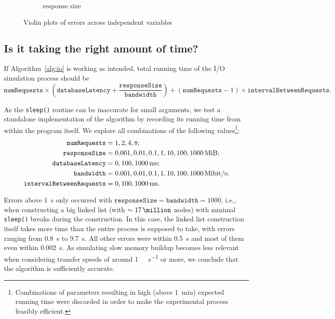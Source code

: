 \documentclass{article}
\begin{document}
\begin{figure}
\begin{subfigure}[t]{0.49\textwidth}
    \caption{response size}
    \label{fig:posterior_violin_response}
  \end{subfigure}
  \caption{Violin plots of errors across independent variables}
  \label{fig:posterior_violins}
\end{figure}

\subsection{Is it taking the right amount of time?}

If Algorithm~\ref{alg:io} is working as intended, total running time of the I/O
simulation process should be
\[
  \texttt{numRequests} \times \left( \texttt{databaseLatency} +
  \frac{\texttt{responseSize}}{\texttt{bandwidth}} \right) +
(\texttt{numRequests} - 1) \times \texttt{intervalBetweenRequests}.
\]

As the \texttt{sleep()} routine can be inaccurate for small arguments, we test
a standalone implementation of the algorithm by recording its running time from
within the program itself. We explore all combinations of the following
values\footnote{Combinations of parameters resulting in high (above
  \SI{1}{\minute}) expected running time were discarded in order to make the
  experimental process feasibly efficient.}:
\begin{align*}
  \texttt{numRequests} &= 1, 2, 4, 8; \\
  \texttt{responseSize} &= 0.001, 0.01, 0.1, 1, 10, 100, \SI{1000}{\mebi\byte}; \\
  \texttt{databaseLatency} &= 0, 100, \SI{1000}{\milli\second}; \\
  \texttt{bandwidth} &= 0.001, 0.01, 0.1, 1, 10, 100, \SI[per-mode=symbol]{1000}{\mebi\bit\per\second}; \\
  \texttt{intervalBetweenRequests} &= 0, 100, \SI{1000}{\milli\second}.
\end{align*}

Errors above \SI{1}{\second} only occurred with $\texttt{responseSize} =
\texttt{bandwidth} = 1000$, i.e., when constructing a big linked list (with
$\sim \SI{17}{\million}$ nodes) with minimal \texttt{sleep()} breaks during the
construction. In this case, the linked list construction itself takes more
time than the entire process is supposed to take, with errors ranging from
\SI{0.8}{\second} to \SI{9.7}{\second}. All other errors were within
\SI{0.5}{\second} and most of them even within \SI{0.002}{\second}. As
simulating slow memory buildup becomes less relevant when considering transfer
speeds of around \SI[per-mode=symbol]{1}{\gibi\bit\per\second} or more, we
conclude that the algorithm is sufficiently accurate.
\end{document}
